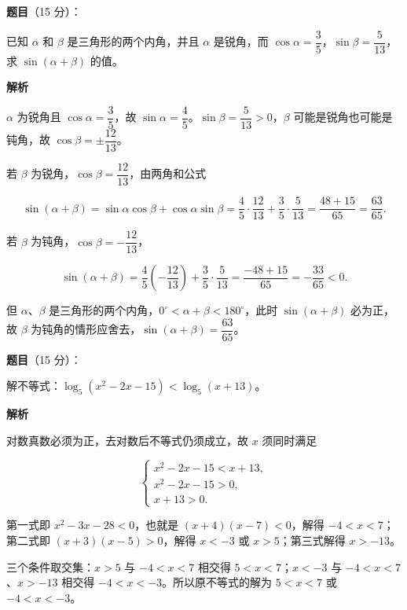 \begin{answer}

\textbf{题目}（15 分）：

已知 $\alpha$ 和 $\beta$ 是三角形的两个内角，并且 $\alpha$ 是锐角，而 $\cos\alpha=\dfrac35$，$\sin\beta=\dfrac5{13}$，求 $\sin(\alpha+\beta)$ 的值。

\textbf{解析}

$\alpha$ 为锐角且 $\cos\alpha=\dfrac35$，故 $\sin\alpha=\dfrac45$。$\sin\beta=\dfrac5{13}>0$，$\beta$ 可能是锐角也可能是钝角，故 $\cos\beta=\pm\dfrac{12}{13}$。

若 $\beta$ 为锐角，$\cos\beta=\dfrac{12}{13}$，由两角和公式

\nopagebreak[4]
\[
\sin(\alpha+\beta)=\sin\alpha\cos\beta+\cos\alpha\sin\beta
=\frac45\cdot\frac{12}{13}+\frac35\cdot\frac5{13}
=\frac{48+15}{65}=\frac{63}{65}.
\]

若 $\beta$ 为钝角，$\cos\beta=-\dfrac{12}{13}$，

\nopagebreak[4]
\[
\sin(\alpha+\beta)=\frac45\left(-\frac{12}{13}\right)+\frac35\cdot\frac5{13}
=\frac{-48+15}{65}=-\frac{33}{65}<0.
\]

但 $\alpha$、$\beta$ 是三角形的两个内角，$0^\circ<\alpha+\beta<180^\circ$，此时 $\sin(\alpha+\beta)$ 必为正，故 $\beta$ 为钝角的情形应舍去，$\sin(\alpha+\beta)=\dfrac{63}{65}$。


\end{answer}
\begin{answer}

\textbf{题目}（15 分）：

解不等式：$\log_5(x^2-2x-15)<\log_5(x+13)$。

\textbf{解析}

对数真数必须为正，去对数后不等式仍须成立，故 $x$ 须同时满足

\nopagebreak[4]
\[
\begin{cases}
x^2-2x-15<x+13,\\
x^2-2x-15>0,\\
x+13>0.
\end{cases}
\]

第一式即 $x^2-3x-28<0$，也就是 $(x+4)(x-7)<0$，解得 $-4<x<7$；第二式即 $(x+3)(x-5)>0$，解得 $x<-3$ 或 $x>5$；第三式解得 $x>-13$。

三个条件取交集：$x>5$ 与 $-4<x<7$ 相交得 $5<x<7$；$x<-3$ 与 $-4<x<7$、$x>-13$ 相交得 $-4<x<-3$。所以原不等式的解为 $5<x<7$ 或 $-4<x<-3$。


\end{answer}
